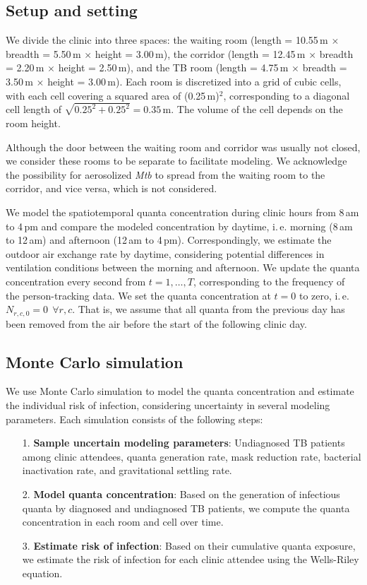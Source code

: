 \documentclass[fleqn,11pt]{wlscirep_supp}
\newcommand\ie{i.\,e.\xspace}
\begin{document}
\subsection{Setup and setting}\label{prep:building}

We divide the clinic into three spaces: the waiting room (length = 10.55\,m $\times$ breadth = 5.50\,m $\times$ height = 3.00\,m), the corridor (length = 12.45\,m $\times$ breadth = 2.20\,m $\times$ height = 2.50\,m), and the TB room (length = 4.75\,m $\times$ breadth = 3.50\,m $\times$ height = 3.00\,m). Each room is discretized into a grid of cubic cells, with each cell covering a squared area of (0.25\,m)$^2$, corresponding to a diagonal cell length of $\sqrt{0.25^2 + 0.25^2} = 0.35$\,m. The volume of the cell depends on the room height.

Although the door between the waiting room and corridor was usually not closed, we consider these rooms to be separate to facilitate modeling. We acknowledge the possibility for aerosolized \emph{Mtb} to spread from the waiting room to the corridor, and vice versa, which is not considered.  

We model the spatiotemporal quanta concentration during clinic hours from 8\,am to 4\,pm and compare the modeled concentration by daytime, \ie morning (8\,am to 12\,am) and afternoon (12\,am to 4\,pm). Correspondingly, we estimate the outdoor air exchange rate by daytime, considering potential differences in ventilation conditions between the morning and afternoon. We update the quanta concentration every second from $t = 1, \dots, T$, corresponding to the frequency of the person-tracking data. We set the quanta concentration at $t=0$ to zero, \ie $N_{r,c,0} = 0 ~~ \forall r, c$. That is, we assume that all quanta from the previous day has been removed from the air before the start of the following clinic day. 


\subsection{Monte Carlo simulation}

We use Monte Carlo simulation to model the quanta concentration and estimate the individual risk of infection, considering uncertainty in several modeling parameters. Each simulation consists of the following steps:
\begin{itemize}
    \item[1.] \textbf{Sample uncertain modeling parameters}: Undiagnosed TB patients among clinic attendees, quanta generation rate, mask reduction rate, bacterial inactivation rate, and gravitational settling rate.
    \item[2.] \textbf{Model quanta concentration}: Based on the generation of infectious quanta by diagnosed and undiagnosed TB patients, we compute the quanta concentration in each room and cell over time.
    \item[3.] \textbf{Estimate risk of infection}: Based on their cumulative quanta exposure, we estimate the risk of infection for each clinic attendee using the Wells-Riley equation.
\end{itemize}
\end{document}
